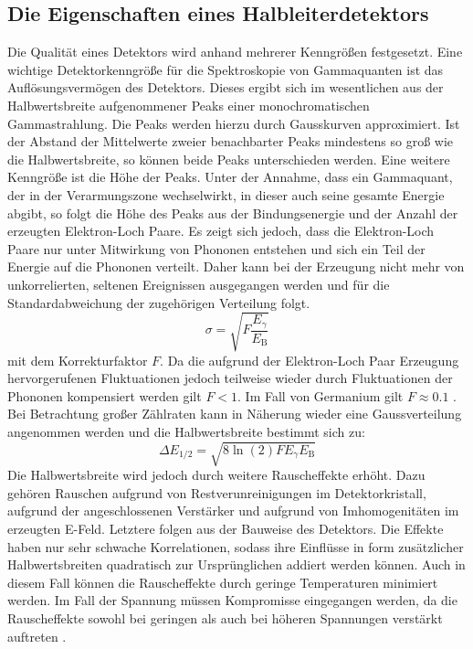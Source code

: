 \subsection{Die Eigenschaften eines Halbleiterdetektors}%
Die Qualität eines Detektors wird anhand mehrerer Kenngrößen festgesetzt.
Eine wichtige Detektorkenngröße für die Spektroskopie von Gammaquanten ist das Auflösungsvermögen des Detektors. Dieses ergibt sich im wesentlichen aus der Halbwertsbreite aufgenommener Peaks einer monochromatischen Gammastrahlung. Die Peaks werden hierzu durch Gausskurven approximiert. Ist der Abstand der Mittelwerte zweier benachbarter Peaks mindestens so groß wie die Halbwertsbreite, so können beide Peaks unterschieden werden. Eine weitere Kenngröße ist die Höhe der Peaks. Unter der Annahme, dass ein Gammaquant, der in der Verarmungszone wechselwirkt, in dieser auch seine gesamte Energie abgibt, so folgt die Höhe des Peaks aus der Bindungsenergie und der Anzahl der erzeugten Elektron-Loch Paare. Es zeigt sich jedoch, dass die Elektron-Loch Paare nur unter Mitwirkung von Phononen entstehen und sich ein Teil der Energie auf die Phononen verteilt. Daher kann bei der Erzeugung nicht mehr von unkorrelierten, seltenen Ereignissen ausgegangen werden und für die Standardabweichung der zugehörigen Verteilung folgt.
\begin{equation}
\sigma = \sqrt{F \frac{E_\gamma}{E_\text{B}} }
\end{equation}
mit dem Korrekturfaktor $F$. Da die aufgrund der Elektron-Loch Paar Erzeugung hervorgerufenen Fluktuationen jedoch teilweise wieder durch Fluktuationen der Phononen kompensiert werden gilt $F < 1$. Im Fall von Germanium gilt $F \approx 0.1$ \cite{V18}. Bei Betrachtung großer Zählraten kann in Näherung wieder eine Gaussverteilung angenommen werden und die Halbwertsbreite bestimmt sich zu:
\begin{equation}
\Delta E_\text{1/2} = \sqrt{8 \ln(2) F E_\gamma E_\text{B}} \label{eq:deltE}
\end{equation}
Die Halbwertsbreite wird jedoch durch weitere Rauscheffekte erhöht. Dazu gehören Rauschen aufgrund von Restverunreinigungen im Detektorkristall, aufgrund der angeschlossenen Verstärker und aufgrund von Imhomogenitäten im erzeugten E-Feld. Letztere folgen aus der Bauweise des Detektors. Die Effekte haben nur sehr schwache Korrelationen, sodass ihre Einflüsse in form zusätzlicher Halbwertsbreiten quadratisch zur Ursprünglichen addiert werden können. Auch in diesem Fall können die Rauscheffekte durch geringe Temperaturen minimiert werden. Im Fall der Spannung müssen Kompromisse eingegangen werden, da die Rauscheffekte sowohl bei geringen als auch bei höheren Spannungen verstärkt auftreten .

